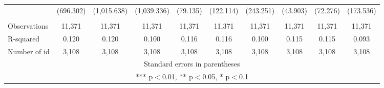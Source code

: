 \documentclass[]{article}
\begin{document}
\begin{tabular}{lccccccccc}
 & (696.302) & (1,015.638) & (1,039.336) & (79.135) & (122.114) & (243.251) & (43.903) & (72.276) & (173.536) \\
 &  &  &  &  &  &  &  &  &  \\
Observations & 11,371 & 11,371 & 11,371 & 11,371 & 11,371 & 11,371 & 11,371 & 11,371 & 11,371 \\
R-squared & 0.120 & 0.120 & 0.100 & 0.116 & 0.116 & 0.100 & 0.115 & 0.115 & 0.093 \\
 Number of id & 3,108 & 3,108 & 3,108 & 3,108 & 3,108 & 3,108 & 3,108 & 3,108 & 3,108 \\ \hline
\multicolumn{10}{c}{ Standard errors in parentheses} \\
\multicolumn{10}{c}{ *** p$<$0.01, ** p$<$0.05, * p$<$0.1} \\
\end{tabular}
\end{document}
